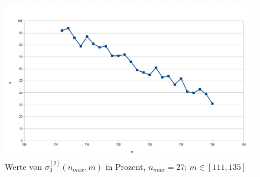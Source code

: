 \documentclass[maincolor=black]{exercise}
\begin{document}
\begin{figure}[t]
	\includegraphics[width=\linewidth]{Diagram-B.png}
	\caption{Werte von $\sigma_3^{[2]}(n_{max},m)$ in Prozent, $n_{max} = 27$; $m \in [111,135]$\label{fig:b2}}
\end{figure}
\end{document}
